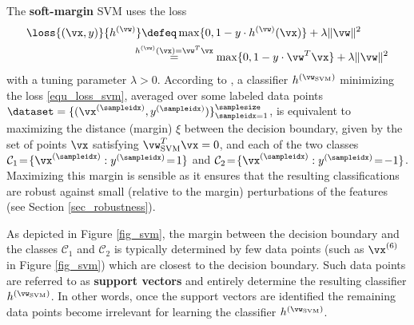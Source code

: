 \documentclass[12pt]{report}
\begin{document}
The {\bf soft-margin} SVM \cite[Chapter 2]{LampertNowKernel} uses the loss  
\begin{align}
\loss{(\vx,y)}{h^{(\vw)}} & \defeq  \max \{ 0 , 1 - y\cdot h^{(\vw)}(\vx) \}  + \lambda \| \vw \|^{2} \nonumber \\
   & \hspace*{-3mm}\stackrel{h^{(\vw)}(\vx) = \vw^{T} \vx}{=}  \max \{ 0 , 1 - y\cdot \vw^{T} \vx \} + \lambda \| \vw \|^{2} \label{equ_loss_svm}
\end{align}
with a tuning parameter $\lambda >0$. According to \cite[Chapter 2]{LampertNowKernel}, a classifier $h^{(\vw_{\rm SVM})}$ 
minimizing the loss \eqref{equ_loss_svm}, averaged over some labeled data points $\dataset = \{ ( \vx^{(\sampleidx)}, y^{(\sampleidx)}) \}_{\sampleidx=1}^{\samplesize}$, 
is equivalent to maximizing the distance (margin) $\xi$ between the decision boundary, given by 
the set of points $\vx$ satisfying $\vw_{\rm SVM}^{T} \vx=0$, and each of the two classes 
$\mathcal{C}_{1}\!=\!\{ \vx^{(\sampleidx)} : y^{(\sampleidx)}\!=\!1\}$ and 
$\mathcal{C}_{2}\!=\!\{ \vx^{(\sampleidx)} : y^{(\sampleidx)}\!=\!-1 \}$. Maximizing this margin is 
sensible as it ensures that the resulting classifications are robust against small (relative to the margin) 
perturbations of the features (see Section \ref{sec_robustness}). 

As depicted in Figure \ref{fig_svm}, the margin between the decision boundary and 
the classes $\mathcal{C}_{1}$ and $\mathcal{C}_{2}$ is typically determined by few 
data points (such as $\vx^{(6)}$ in Figure \ref{fig_svm}) which are closest to the 
decision boundary. Such data points are referred to as {\bf support vectors} and 
entirely determine the resulting classifier $h^{(\vw_{\rm SVM})}$. In other words, once 
the support vectors are identified the remaining data points become irrelevant for 
learning the classifier $h^{(\vw_{\rm SVM})}$. 
\end{document}
